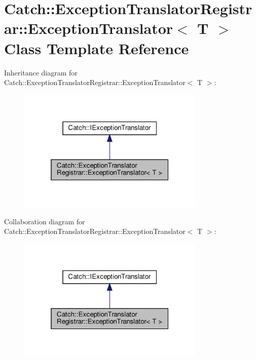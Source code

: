 \hypertarget{classCatch_1_1ExceptionTranslatorRegistrar_1_1ExceptionTranslator}{}\section{Catch\+:\+:Exception\+Translator\+Registrar\+:\+:Exception\+Translator$<$ T $>$ Class Template Reference}
\label{classCatch_1_1ExceptionTranslatorRegistrar_1_1ExceptionTranslator}


Inheritance diagram for Catch\+:\+:Exception\+Translator\+Registrar\+:\+:Exception\+Translator$<$ T $>$\+:
\nopagebreak
\begin{figure}[H]
\begin{center}
\leavevmode
\includegraphics[width=253pt]{classCatch_1_1ExceptionTranslatorRegistrar_1_1ExceptionTranslator__inherit__graph}
\end{center}
\end{figure}


Collaboration diagram for Catch\+:\+:Exception\+Translator\+Registrar\+:\+:Exception\+Translator$<$ T $>$\+:
\nopagebreak
\begin{figure}[H]
\begin{center}
\leavevmode
\includegraphics[width=253pt]{classCatch_1_1ExceptionTranslatorRegistrar_1_1ExceptionTranslator__coll__graph}
\end{center}
\end{figure}
